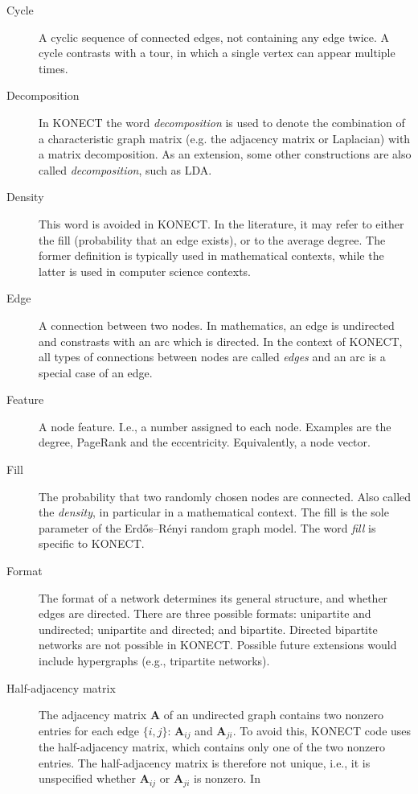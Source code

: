 \documentclass{article}
\begin{document}
\begin{description}
  \item[Cycle] 
    A cyclic sequence of connected edges, not containing any edge twice.
    A cycle contrasts with a tour, in which a single vertex can appear
    multiple times.  
  \item[Decomposition] In KONECT the word \emph{decomposition} is used
    to denote the combination of a characteristic graph matrix (e.g. the
    adjacency matrix or Laplacian) with a matrix decomposition.  As an
    extension, some other constructions are also called
    \emph{decomposition}, such as LDA.
  \item[Density] This word is avoided in KONECT.  In the literature, it
    may refer to either the fill (probability that an edge exists), or to
    the average degree.  The former definition is typically used in mathematical
    contexts, while the latter is used in computer science contexts.
  \item[Edge] A connection between two nodes.  In mathematics, an edge
    is undirected and constrasts with an arc which is directed.  In the
    context of KONECT, all types of connections between nodes are called
    \emph{edges} and an arc is a special case of an edge. 
  \item[Feature] A node feature. I.e., a number assigned to each node.
    Examples are the degree, PageRank and the eccentricity. 
    Equivalently, a node vector.
  \item[Fill] The probability that two randomly chosen nodes are
    connected.  Also called the \emph{density}, in particular in a
    mathematical context.  The fill is the sole parameter of the
    Erdős--Rényi random graph model.  The word \emph{fill} is specific
    to KONECT. 
  \item[Format] 
    The format of a network determines its general structure, and
    whether edges are directed.  There are three possible formats:
    unipartite and undirected; unipartite and directed; and bipartite.
    Directed bipartite networks are not possible in KONECT.  Possible future
    extensions would include hypergraphs (e.g., tripartite networks).  
  \item[Half-adjacency matrix]
    The adjacency matrix $\mathbf A$ of an undirected graph contains two
    nonzero entries for each edge $\{i,j\}$:  $\mathbf A_{ij}$ and
    $\mathbf A_{ji}$.  To avoid this, KONECT code uses the
    half-adjacency matrix, which contains only one of the two nonzero
    entries.  The half-adjacency matrix is therefore not unique, i.e.,
    it is unspecified whether $\mathbf A_{ij}$ or $\mathbf A_{ji}$ is nonzero.  In

\end{description}
\end{document}

